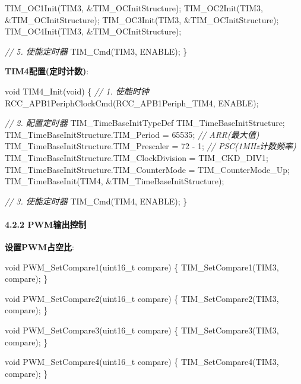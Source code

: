 \documentclass[
]{article}
\newenvironment{Shaded}{}{}
\newcommand{\CommentTok}[1]{\textcolor[rgb]{0.38,0.63,0.69}{\textit{#1}}}
\newcommand{\DataTypeTok}[1]{\textcolor[rgb]{0.56,0.13,0.00}{#1}}
\newcommand{\DecValTok}[1]{\textcolor[rgb]{0.25,0.63,0.44}{#1}}
\newcommand{\NormalTok}[1]{#1}
\begin{document}
\begin{Shaded}
\begin{Highlighting}[]
\NormalTok{    TIM\_OC1Init(TIM3, \&TIM\_OCInitStructure);}
\NormalTok{    TIM\_OC2Init(TIM3, \&TIM\_OCInitStructure);}
\NormalTok{    TIM\_OC3Init(TIM3, \&TIM\_OCInitStructure);}
\NormalTok{    TIM\_OC4Init(TIM3, \&TIM\_OCInitStructure);}
    
    \CommentTok{// 5. 使能定时器}
\NormalTok{    TIM\_Cmd(TIM3, ENABLE);}
\NormalTok{\}}
\end{Highlighting}
\end{Shaded}

\textbf{TIM4配置(定时计数)}:

\begin{Shaded}
\begin{Highlighting}[]
\DataTypeTok{void}\NormalTok{ TIM4\_Init(}\DataTypeTok{void}\NormalTok{)}
\NormalTok{\{}
    \CommentTok{// 1. 使能时钟}
\NormalTok{    RCC\_APB1PeriphClockCmd(RCC\_APB1Periph\_TIM4, ENABLE);}
    
    \CommentTok{// 2. 配置定时器}
\NormalTok{    TIM\_TimeBaseInitTypeDef TIM\_TimeBaseInitStructure;}
\NormalTok{    TIM\_TimeBaseInitStructure.TIM\_Period = }\DecValTok{65535}\NormalTok{;           }\CommentTok{// ARR(最大值)}
\NormalTok{    TIM\_TimeBaseInitStructure.TIM\_Prescaler = }\DecValTok{72}\NormalTok{ {-} }\DecValTok{1}\NormalTok{;       }\CommentTok{// PSC(1MHz计数频率)}
\NormalTok{    TIM\_TimeBaseInitStructure.TIM\_ClockDivision = TIM\_CKD\_DIV1;}
\NormalTok{    TIM\_TimeBaseInitStructure.TIM\_CounterMode = TIM\_CounterMode\_Up;}
\NormalTok{    TIM\_TimeBaseInit(TIM4, \&TIM\_TimeBaseInitStructure);}
    
    \CommentTok{// 3. 使能定时器}
\NormalTok{    TIM\_Cmd(TIM4, ENABLE);}
\NormalTok{\}}
\end{Highlighting}
\end{Shaded}

\hypertarget{pwmux8f93ux51faux63a7ux5236}{%
\paragraph{4.2.2 PWM输出控制}\label{pwmux8f93ux51faux63a7ux5236}}

\textbf{设置PWM占空比}:

\begin{Shaded}
\begin{Highlighting}[]
\DataTypeTok{void}\NormalTok{ PWM\_SetCompare1(}\DataTypeTok{uint16\_t}\NormalTok{ compare)}
\NormalTok{\{}
\NormalTok{    TIM\_SetCompare1(TIM3, compare);}
\NormalTok{\}}

\DataTypeTok{void}\NormalTok{ PWM\_SetCompare2(}\DataTypeTok{uint16\_t}\NormalTok{ compare)}
\NormalTok{\{}
\NormalTok{    TIM\_SetCompare2(TIM3, compare);}
\NormalTok{\}}

\DataTypeTok{void}\NormalTok{ PWM\_SetCompare3(}\DataTypeTok{uint16\_t}\NormalTok{ compare)}
\NormalTok{\{}
\NormalTok{    TIM\_SetCompare3(TIM3, compare);}
\NormalTok{\}}

\DataTypeTok{void}\NormalTok{ PWM\_SetCompare4(}\DataTypeTok{uint16\_t}\NormalTok{ compare)}
\NormalTok{\{}
\NormalTok{    TIM\_SetCompare4(TIM3, compare);}
\NormalTok{\}}
\end{Highlighting}
\end{Shaded}
\end{document}
